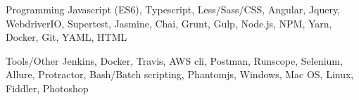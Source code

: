 

\begin{cvskills}

  \cvskill
    {Programming} %
    {Javascript (ES6), Typescript, Less/Sass/CSS, Angular, Jquery, WebdriverIO, Supertest, Jasmine, Chai, Grunt, Gulp, Node.js, NPM, Yarn, Docker, Git, YAML, HTML} %

  \cvskill
    {Tools/Other} %
    {Jenkins, Docker, Travis, AWS cli, Postman, Runscope, Selenium, Allure, Protractor, Bash/Batch scripting, Phantomjs, Windows, Mac OS, Linux, Fiddler, Photoshop} %

\end{cvskills}